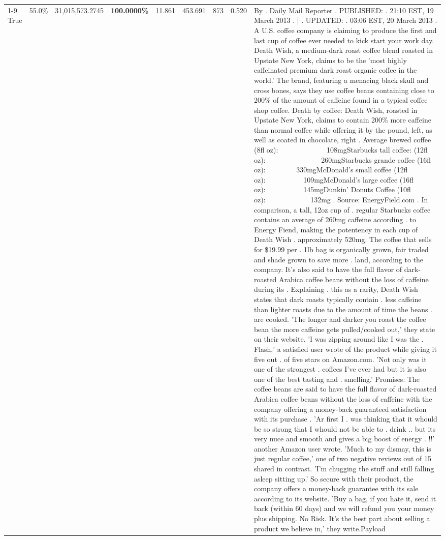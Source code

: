 \begin{table}[H]
{\begin{tabular}{lllrlllll}
\cline{1-9}
True & 55.0\% & 31,015,573.2745 & \bfseries \color{red} 100.0000\% & 11.861 & 453.691 & 873 & 0.520 & By . Daily Mail Reporter . PUBLISHED: . 21:10 EST, 19 March 2013 . | . UPDATED: . 03:06 EST, 20 March 2013 . A U.S. coffee company is claiming to produce the first and last cup of coffee ever needed to kick start your work day. Death Wish, a medium-dark roast coffee blend roasted in Upstate New York, claims to be the 'most highly caffeinated premium dark roast organic coffee in the world.' The brand, featuring a menacing black skull and cross bones, says they use coffee beans containing close to 200\% of the amount of caffeine found in a typical coffee shop coffee. Death by coffee: Death Wish, roasted in Upstate New York, claims to contain 200\% more caffeine than normal coffee while offering it by the pound, left, as well as coated in chocolate, right . Average brewed coffee (8fl oz):              108mgStarbucks tall coffee: (12fl oz):                260mgStarbucks grande coffee (16fl oz):         330mgMcDonald's small coffee (12fl oz):           109mgMcDonald's large coffee (16fl oz):           145mgDunkin' Donuts Coffee (10fl oz):             132mg . Source: EnergyField.com . In comparison, a tall, 12oz cup of . regular Starbucks coffee contains an average of 260mg caffeine according . to Energy Fiend, making the potentency in each cup of Death Wish . approximately 520mg. The coffee that sells for \$19.99 per . 1lb bag is organically grown, fair traded and shade grown to save more . land, according to the company. It's also said to have the full flavor of dark-roasted Arabica coffee beans without the loss of caffeine during its . Explaining . this as a rarity, Death Wish states that dark roasts typically contain . less caffeine than lighter roasts due to the amount of time the beans . are cooked. 'The longer and darker you roast the coffee bean the more caffeine gets pulled/cooked out,' they state on their website. 'I was zipping around like I was the . Flash,' a satisfied user wrote of the product while giving it five out . of five stars on Amazon.com. 'Not only was it one of the strongest . coffees I've ever had but it is also one of the best tasting and . smelling.’ Promises: The coffee beans are said to have the full flavor of dark-roasted Arabica coffee beans without the loss of caffeine with the company offering a money-back guaranteed satisfaction with its purchase . 'Ar first I . was thinking that it whould be so strong that I whould not be able to . drink .. but its very nuce and smooth and gives a big boost of energy . !!' another Amazon user wrote. 'Much to my dismay, this is just regular coffee,' one of two negative reviews out of 15 shared in contrast. 'I'm chugging the stuff and still falling asleep sitting up.' So secure with their product, the company offers a money-back guarantee with its sale according to its website. 'Buy a bag, if you hate it, send it back (within 60 days) and we will refund you your money plus shipping. No Risk. It’s the best part about selling a product we believe in,' they write.Payload \\

\end{tabular}}
\end{table}
